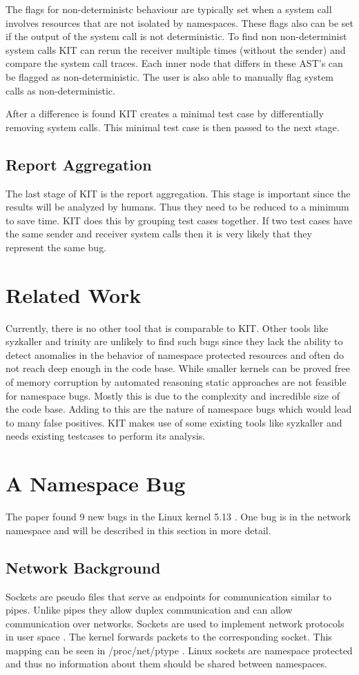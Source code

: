 \documentclass[10pt,twocolumn,a4paper]{article}
\begin{document}
The flags for non-deterministc behaviour are typically set when a system call involves resources that are not isolated by namespaces.
These flags also can be set if the output of the system call is not deterministic. 
To find non non-determinist system calls KIT can rerun the receiver multiple times (without the sender) and compare the system call traces.
Each inner node that differs in these AST's can be flagged as non-deterministic.
The user is also able to manually flag system calls as non-deterministic\cite{0}.

After a difference is found KIT creates a minimal test case by differentially removing system calls.
This minimal test case is then passed to the next stage\cite{0}.
\subsection{Report Aggregation}
The last stage of KIT is the report aggregation. This stage is important since the results will be
analyzed by humans.
Thus they need to be reduced to a minimum to save time.
KIT does this by grouping test cases together.
If two test cases have the same sender and receiver system calls then it is very likely that they represent the same bug\cite{0}. 

\section{Related Work}
Currently, there is no other tool that is comparable to  KIT. Other tools like syzkaller\cite{4} and trinity\cite{5} are
unlikely to find such bugs since they lack the ability to detect anomalies in the behavior of
namespace protected resources and often do not reach deep enough in the code base.
While smaller kernels can be proved free of memory corruption by automated reasoning static approaches are not feasible for namespace bugs.\cite{30} 
Mostly this is due to the complexity and incredible size of the code base. Adding to this are the nature of namespace bugs 
which would lead to many false positives.
KIT makes use of some existing tools like syzkaller and needs existing testcases to
perform its analysis\cite{0}\cite{2}.
\section{A Namespace Bug}\label{sec:bug}
The paper found 9 new bugs in the Linux kernel 5.13 \cite{0}. One bug is in the network namespace
and will be described in this section in more detail. 
\subsection{Network Background}
Sockets are pseudo files that serve as endpoints for communication similar to pipes. Unlike pipes
they allow duplex communication and can allow communication over networks\cite{5}. Sockets are
used to implement network protocols in user space \cite{5}. The kernel forwards packets to the
corresponding socket. This mapping can be seen in /proc/net/ptype \cite{6}. Linux sockets are
namespace protected and thus no information about them should be shared between namespaces.
\end{document}
